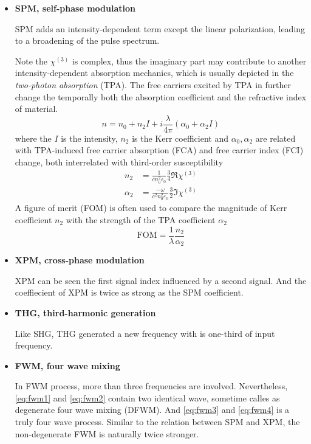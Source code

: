 \begin{itemize}
    \item \textbf{SPM, self-phase modulation}
    
    SPM adds an intensity-dependent term except the linear polarization, leading to a broadening of the pulse spectrum.
    
    Note the $\chi^{(3)}$ is complex, thus the imaginary part may contribute to another intensity-dependent absorption mechanics, which is usually depicted in the \textit{two-photon absorption} (TPA). The free carriers excited by TPA in further change the temporally both the absorption coefficient and the refractive index of material.
    \begin{equation}\label{eq:spm-index}
        n = n_0 + n_2 I + i \frac{\lambda}{4\pi}(\alpha_0 + \alpha_2 I)
    \end{equation}
    where the $I$ is the intensity, $n_2$ is the Kerr coefficient and $\alpha_0, \alpha_2$ are related with TPA-induced free carrier absorption (FCA) and free carrier index (FCI) change, both interrelated with third-order susceptibility
    \begin{align}
        n_2     &= \frac{1}{cn_0^2\varepsilon_0} \frac{3}{4} \Re{\chi^{(3)}} \\
        \alpha_2&= \frac{-\omega}{c^2n_0^2\varepsilon_0} \frac{3}{2} \Im{\chi^{(3)}}
    \end{align}
    A figure of merit (FOM) is often used to compare the magnitude of Kerr coefficient $n_2$ with the strength of the TPA coefficient $\alpha_2$
    \begin{equation}
        \mathrm{FOM} = \frac{1}{\lambda} \frac{n_2}{\alpha_2}
    \end{equation}
    
    \item \textbf{XPM, cross-phase modulation} 
    
    XPM can be seen the first signal index influenced by a second signal. And the coeffiecient of XPM is twice as strong as the SPM coefficient.
    \item \textbf{THG, third-harmonic generation} 
    
    Like SHG, THG generated a new frequency with is one-third of input frequency. 
    \item \textbf{FWM, four wave mixing} 
    
In FWM process, more than three frequencies are involved. Nevertheless, \autoref{eq:fwm1} and \autoref{eq:fwm2} contain two identical wave, sometime calles as degenerate four wave mixing (DFWM). And \autoref{eq:fwm3} and \autoref{eq:fwm4} is a truly four wave process. Similar to the relation between SPM and XPM, the non-degenerate FWM is naturally twice stronger.


\end{itemize}
